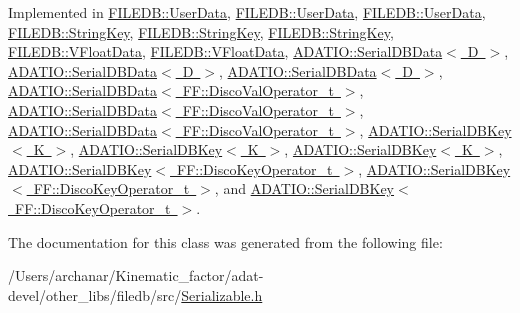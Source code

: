 Implemented in \mbox{\hyperlink{classFILEDB_1_1UserData_a42b5e25b3cba7274363590c5b6861795}{F\+I\+L\+E\+D\+B\+::\+User\+Data}}, \mbox{\hyperlink{classFILEDB_1_1UserData_a42b5e25b3cba7274363590c5b6861795}{F\+I\+L\+E\+D\+B\+::\+User\+Data}}, \mbox{\hyperlink{classFILEDB_1_1UserData_a42b5e25b3cba7274363590c5b6861795}{F\+I\+L\+E\+D\+B\+::\+User\+Data}}, \mbox{\hyperlink{classFILEDB_1_1StringKey_a29db7eea425c851c5e0a4336d7a85fb1}{F\+I\+L\+E\+D\+B\+::\+String\+Key}}, \mbox{\hyperlink{classFILEDB_1_1StringKey_a29db7eea425c851c5e0a4336d7a85fb1}{F\+I\+L\+E\+D\+B\+::\+String\+Key}}, \mbox{\hyperlink{classFILEDB_1_1StringKey_a29db7eea425c851c5e0a4336d7a85fb1}{F\+I\+L\+E\+D\+B\+::\+String\+Key}}, \mbox{\hyperlink{classFILEDB_1_1VFloatData_afad9c7e520cdd7bf9ae0b477b8a5f1f1}{F\+I\+L\+E\+D\+B\+::\+V\+Float\+Data}}, \mbox{\hyperlink{classFILEDB_1_1VFloatData_afad9c7e520cdd7bf9ae0b477b8a5f1f1}{F\+I\+L\+E\+D\+B\+::\+V\+Float\+Data}}, \mbox{\hyperlink{classADATIO_1_1SerialDBData_a5266e4f1c065f0776f9974d6fad51a2f}{A\+D\+A\+T\+I\+O\+::\+Serial\+D\+B\+Data$<$ D $>$}}, \mbox{\hyperlink{classADATIO_1_1SerialDBData_a5266e4f1c065f0776f9974d6fad51a2f}{A\+D\+A\+T\+I\+O\+::\+Serial\+D\+B\+Data$<$ D $>$}}, \mbox{\hyperlink{classADATIO_1_1SerialDBData_a5266e4f1c065f0776f9974d6fad51a2f}{A\+D\+A\+T\+I\+O\+::\+Serial\+D\+B\+Data$<$ D $>$}}, \mbox{\hyperlink{classADATIO_1_1SerialDBData_a5266e4f1c065f0776f9974d6fad51a2f}{A\+D\+A\+T\+I\+O\+::\+Serial\+D\+B\+Data$<$ F\+F\+::\+Disco\+Val\+Operator\+\_\+t $>$}}, \mbox{\hyperlink{classADATIO_1_1SerialDBData_a5266e4f1c065f0776f9974d6fad51a2f}{A\+D\+A\+T\+I\+O\+::\+Serial\+D\+B\+Data$<$ F\+F\+::\+Disco\+Val\+Operator\+\_\+t $>$}}, \mbox{\hyperlink{classADATIO_1_1SerialDBData_a5266e4f1c065f0776f9974d6fad51a2f}{A\+D\+A\+T\+I\+O\+::\+Serial\+D\+B\+Data$<$ F\+F\+::\+Disco\+Val\+Operator\+\_\+t $>$}}, \mbox{\hyperlink{classADATIO_1_1SerialDBKey_a6e2d9bbd18a3fa5e049f0ad5321d328a}{A\+D\+A\+T\+I\+O\+::\+Serial\+D\+B\+Key$<$ K $>$}}, \mbox{\hyperlink{classADATIO_1_1SerialDBKey_a6e2d9bbd18a3fa5e049f0ad5321d328a}{A\+D\+A\+T\+I\+O\+::\+Serial\+D\+B\+Key$<$ K $>$}}, \mbox{\hyperlink{classADATIO_1_1SerialDBKey_a6e2d9bbd18a3fa5e049f0ad5321d328a}{A\+D\+A\+T\+I\+O\+::\+Serial\+D\+B\+Key$<$ K $>$}}, \mbox{\hyperlink{classADATIO_1_1SerialDBKey_a6e2d9bbd18a3fa5e049f0ad5321d328a}{A\+D\+A\+T\+I\+O\+::\+Serial\+D\+B\+Key$<$ F\+F\+::\+Disco\+Key\+Operator\+\_\+t $>$}}, \mbox{\hyperlink{classADATIO_1_1SerialDBKey_a6e2d9bbd18a3fa5e049f0ad5321d328a}{A\+D\+A\+T\+I\+O\+::\+Serial\+D\+B\+Key$<$ F\+F\+::\+Disco\+Key\+Operator\+\_\+t $>$}}, and \mbox{\hyperlink{classADATIO_1_1SerialDBKey_a6e2d9bbd18a3fa5e049f0ad5321d328a}{A\+D\+A\+T\+I\+O\+::\+Serial\+D\+B\+Key$<$ F\+F\+::\+Disco\+Key\+Operator\+\_\+t $>$}}.



The documentation for this class was generated from the following file\+:\begin{DoxyCompactItemize}
\item 
/\+Users/archanar/\+Kinematic\+\_\+factor/adat-\/devel/other\+\_\+libs/filedb/src/\mbox{\hyperlink{adat-devel_2other__libs_2filedb_2src_2Serializable_8h}{Serializable.\+h}}\end{DoxyCompactItemize}

